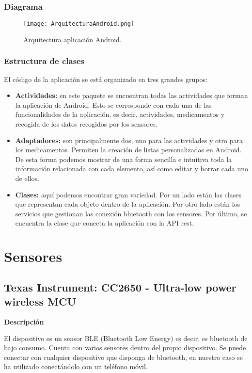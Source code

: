 \documentclass[11pt,spanish]{article}
\begin{document}
\subsubsection{Diagrama}
\begin{figure}[h!]
  \centering
  \texttt{[image: ArquitecturaAndroid.png]}
  \caption{Arquitectura aplicación Android.}
\end{figure}

\subsubsection{Estructura de clases}
El código de la aplicación se está organizado en tres grandes grupos:

\begin{itemize}
	\item {\bf Actividades: } en este paquete se encuentran todas las actividades que forman la aplicación de Android. Esto se corresponde con cada una de las funcionalidades de la aplicación, es decir, actividades, medicamentos y recogida de los datos recogidos por los sensores.
    \item {\bf Adaptadores: } son principalmente dos, uno para las actividades y otro para los medicamentos. Permiten la creación de listas personalizadas en Android. De esta forma podemos mostrar de una forma sencilla e intuitiva toda la información relacionada con cada elemento, así como editar y borrar cada uno de ellos.
    \item {\bf Clases: } aquí podemos encontrar gran variedad. Por un lado están las clases que representan cada objeto dentro de la aplicación. Por otro lado están los servicios que gestionan las conexión bluetooth con los sensores. Por último, se encuentra la clase que conecta la aplicación con la API rest.
\end{itemize}
\newpage

\section{Sensores}
\subsection{Texas Instrument: CC2650 - Ultra-low power wireless MCU}
{\bf Descripción}
\newline

El dispositivo es un sensor BLE (Bluetooth Low Energy) es decir, es bluetooth de bajo consumo. Cuenta con varios sensores dentro del propio dispositivo. Se puede conectar con cualquier dispositivo que disponga de bluetooth, en nuestro caso se ha utilizado conectándolo con un teléfono móvil. 
\end{document}
